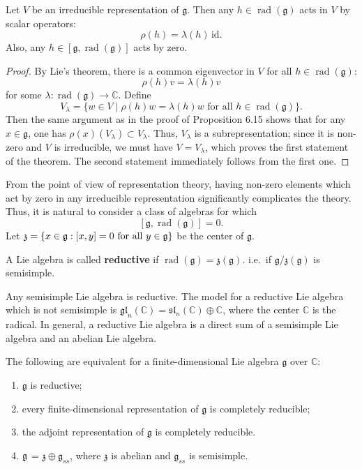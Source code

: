 \documentclass[12pt]{article}
\begin{document}
\begin{theorem}
    Let $V$ be an irreducible representation of $\mathfrak g$. Then any $h \in \operatorname{rad}(\mathfrak g)$ acts in $V$ by scalar operators:
    \[
        \rho(h) = \lambda(h)\,\mathrm{id}.
    \]
    Also, any $h \in [\mathfrak g, \operatorname{rad}(\mathfrak g)]$ acts by zero.
\end{theorem}

\begin{proof}
    By Lie's theorem, there is a common eigenvector in $V$ for all $h \in \operatorname{rad}(\mathfrak g)$:
    \[
        \rho(h)v = \lambda(h)v
    \]
    for some $\lambda : \operatorname{rad}(\mathfrak g) \to \mathbb{C}$. Define
    \[
        V_\lambda = \{ w \in V \mid \rho(h)w = \lambda(h)w \text{ for all } h \in \operatorname{rad}(\mathfrak g) \}.
    \]
    Then the same argument as in the proof of Proposition 6.15 shows that for any $x \in \mathfrak g$, one has $\rho(x)(V_\lambda) \subset V_\lambda$. Thus, $V_\lambda$ is a subrepresentation; since it is non-zero and $V$ is irreducible, we must have $V = V_\lambda$, which proves the first statement of the theorem. The second statement immediately follows from the first one.
\end{proof}

From the point of view of representation theory, having non-zero elements which act by zero in any irreducible representation significantly complicates the theory. Thus, it is natural to consider a class of algebras for which
\[
    [\mathfrak g, \operatorname{rad}(\mathfrak g)] = 0.
\]
Let $\mathfrak{z} = \{x\in \mathfrak g : [x,y]=0 \text{ for all } y\in \mathfrak g\}$ be the center of $\mathfrak g$.
\begin{definition}
    A Lie algebra is called \textbf{reductive} if $\operatorname{rad}(\mathfrak g) = \mathfrak z(\mathfrak g)$. i.e.\ if $\mathfrak g / \mathfrak z(\mathfrak g)$ is semisimple.
\end{definition}
Any semisimple Lie algebra is reductive. The model for a reductive Lie algebra which is not semisimple is $\mathfrak{gl}_n(\mathbb C) = \mathfrak{sl}_n(\mathbb C) \oplus \mathbb C$, where the center $\mathbb C$ is the radical. In general, a reductive Lie algebra is a direct sum of a semisimple Lie algebra and an abelian Lie algebra.

\begin{proposition}
    The following are equivalent for a finite-dimensional Lie algebra $\mathfrak g$ over $\mathbb{C}$:
    \begin{enumerate}
        \item $\mathfrak g$ is reductive;
        \item every finite-dimensional representation of $\mathfrak g$ is completely reducible;
        \item the adjoint representation of $\mathfrak g$ is completely reducible.
        \item $\mathfrak{g}$ = $\mathfrak z \oplus \mathfrak g_{ss}$, where $\mathfrak z$ is abelian and $\mathfrak g_{ss}$ is semisimple.
    \end{enumerate}

\end{proposition}
\end{document}
